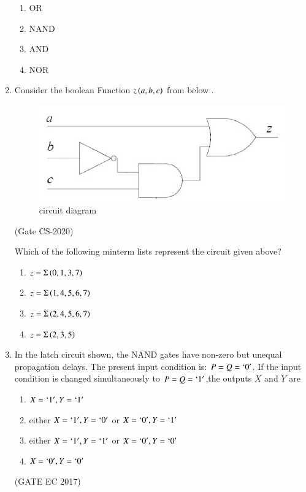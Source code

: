\begin{enumerate}
	\begin{enumerate}
       \item OR
       \item NAND
       \item AND
       \item NOR
   \end{enumerate}
\item Consider the boolean Function $z\left(a,b,c\right)$ from below .
		\begin{figure}[H]
			\centering
			\includegraphics[width=\columnwidth]{figs/203.png}
			\caption{circuit diagram}
		\end{figure}
		
	\hfill{(Gate CS-2020)}
	
		Which of the following minterm lists represent the circuit given above?
	\begin{enumerate}
		\item $z=\Sigma\left(0,1,3,7\right)$
		\item $z=\Sigma\left(1,4,5,6,7\right)$
		\item $z=\Sigma\left(2,4,5,6,7\right)$
		\item $z=\Sigma\left(2,3,5\right)$
	\end{enumerate}	   
\item In the latch circuit shown, the NAND gates have non-zero but unequal propagation delays. The present input condition is: $P=Q=\lq 0\rq$. If the input condition is changed simultaneously to $P=Q=\lq 1\rq$,the outputs $X$ and $Y$ are 
\begin{figure}[H]
\centering
\label{figure_1}

\end{figure}
\begin{enumerate}
\item $X=\lq 1\rq,Y=\lq 1 \rq$
\item either $X=\lq 1\rq,Y=\lq 0\rq$ or $X=\lq 0\rq,Y=\lq 1\rq$
\item either $X=\lq 1\rq,Y=\lq 1\rq$ or $X=\lq 0\rq,Y=\lq 0\rq$
\item $X=\lq 0\rq,Y=\lq 0 \rq$
\end{enumerate}
\hfill(GATE EC 2017)


\end{enumerate}
